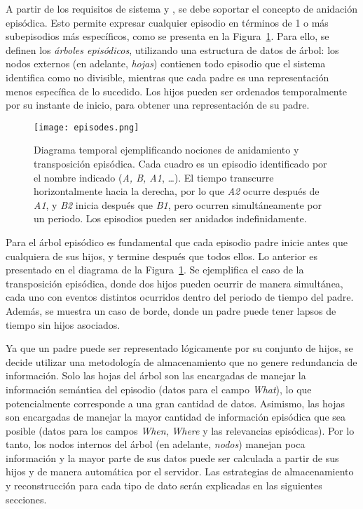 A partir de los requisitos de sistema  y , se debe soportar el concepto de anidación episódica. Esto permite expresar cualquier episodio en términos de 1 o más subepisodios más específicos, como se presenta en la Figura~\ref{img:episodes}. Para ello, se definen los \textit{árboles episódicos}, utilizando una estructura de datos de árbol: los nodos externos (en adelante, \textit{hojas}) contienen todo episodio que el sistema identifica como no divisible, mientras que cada padre es una representación menos específica de lo sucedido. Los hijos pueden ser ordenados temporalmente por su instante de inicio, para obtener una representación de su padre.

\begin{figure}[!ht]
	\centering
	\texttt{[image: episodes.png]}
	\caption[Concepto de anidamiento y transposición episódica.]
	{\small Diagrama temporal ejemplificando nociones de anidamiento y transposición episódica. Cada cuadro es un episodio identificado por el nombre indicado (\textit{A, B, A1}, \ldots). El tiempo transcurre horizontalmente hacia la derecha, por lo que \textit{A2} ocurre después de \textit{A1}, y \textit{B2} inicia después que \textit{B1}, pero ocurren simultáneamente por un periodo. Los episodios pueden ser anidados indefinidamente.}
	\label{img:episodes}
\end{figure}

Para el árbol episódico es fundamental que cada episodio padre inicie antes que cualquiera de sus hijos, y termine después que todos ellos. Lo anterior es presentado en el diagrama de la Figura~\ref{img:episodes}. Se ejemplifica el caso de la transposición episódica, donde dos hijos pueden ocurrir de manera simultánea, cada uno con eventos distintos ocurridos dentro del periodo de tiempo del padre. Además, se muestra un caso de borde, donde un padre puede tener lapsos de tiempo sin hijos asociados.

Ya que un padre puede ser representado lógicamente por su conjunto de hijos, se decide utilizar una metodología de almacenamiento que no genere redundancia de información. Solo las hojas del árbol son las encargadas de manejar la información semántica del episodio (datos para el campo \textit{What}), lo que potencialmente corresponde a una gran cantidad de datos. Asimismo, las hojas son encargadas de manejar la mayor cantidad de información episódica que sea posible (datos para los campos \textit{When}, \textit{Where} y las relevancias episódicas). Por lo tanto, los nodos internos del árbol (en adelante, \textit{nodos}) manejan poca información y la mayor parte de sus datos puede ser calculada a partir de sus hijos y de manera automática por el servidor. Las estrategias de almacenamiento y reconstrucción para cada tipo de dato serán explicadas en las siguientes secciones. 

